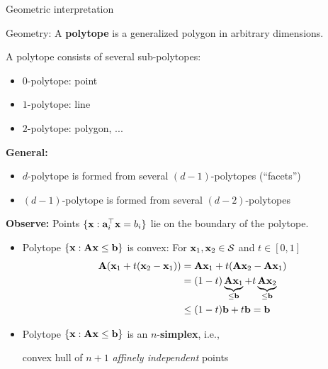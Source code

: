 \documentclass[11pt,compress,t,notes=noshow, xcolor=table]{beamer}
\begin{document}
\begin{vbframe}{Geometric interpretation}


\framebreak

Geometry: A \textbf{polytope} is a generalized polygon in arbitrary dimensions.

\medskip

A polytope consists of several sub-polytopes:
\begin{itemize}
    \setlength{\itemsep}{1em}
    \item $0$-polytope: point
    \item $1$-polytope: line
    \item $2$-polytope: polygon, ...
\end{itemize}

\medskip

\textbf{General:}
\begin{itemize}
    \setlength{\itemsep}{1em}
    \item $d$-polytope is formed from several $(d-1)$-polytopes (\enquote{facets})
    \item $(d-1)$-polytope is formed from several $(d-2)$-polytopes
\end{itemize}

\framebreak

\textbf{Observe:} Points $\{\mathbf{x}: \mathbf{a}_i^\top \mathbf{x} = b_i\}$ lie on the boundary of the polytope.

\medskip

\begin{itemize}
    \item Polytope $\{ \mathbf{x}: \mathbf{A} \mathbf{x} \le \mathbf{b}\}$ is convex: For $\mathbf{x}_1,\mathbf{x}_2 \in \mathcal{S}$ and $t \in [0, 1]$
        \begin{align*}
            \mathbf{A}(\mathbf{x}_1 + t(\mathbf{x}_2 - \mathbf{x}_1)) &= \mathbf{A}\mathbf{x}_1 + t(\mathbf{A}\mathbf{x}_2 - \mathbf{A}\mathbf{x}_1) \\
            &= (1 -t)\underbrace{\mathbf{A}\mathbf{x}_1}_{\le \mathbf{b}} + t\underbrace{\mathbf{A}\mathbf{x}_2}_{\le \mathbf{b}} \\ &\le (1 - t) \mathbf{b} + t \mathbf{b} = \mathbf{b}
        \end{align*}
    \item Polytope $\{ \mathbf{x}: \mathbf{A} \mathbf{x} \le \mathbf{b}\}$ is an $n$-\textbf{simplex}, i.e.,
        \begin{center}
            convex hull of $n + 1$ \textit{affinely independent} points
        \end{center}
\end{itemize}


\end{vbframe}
\end{document}

